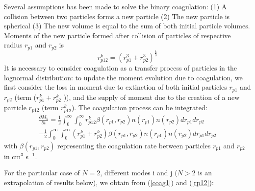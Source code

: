 Several assumptions has been made to solve the binary coagulation:
(1) A collision between two particles forms a new particle
(2) The new particle is spherical
(3) The new volume is equal to the sum of both initial particle volumes.
Moments of the new particle formed after collision of particles of respective radius 
$r_{p1}$ and $r_{p2}$ is 
\begin{equation}
r_{p12}^k = (r_{p1}^3 + r_{p2}^3)^{\frac{k}{3}}
\label{rp12}
\end{equation}
It is necessary to consider coagulation as a transfer process  of particles in 
the lognormal distribution: to update the moment evolution due to coagulation, 
 we first consider the loss in moment due to extinction of 
both initial particles 
 $r_{p1}$ and $r_{p2}$ (term ($r_{p1}^k + r_{p2}^k$ )), and the supply of moment 
due to the
 creation of a new particle  $r_{p12}$ (term  $r_{p12}^k$). 
 The coagulation process can be integrated:
 \begin{eqnarray}
\frac{\partial M_k}{\partial t} = \frac{1}{2} \int_{0}^{\infty} 
\int_{0}^{\infty} r_{p12}^k
\beta(r_{p1},r_{p2}) n(r_{p1}) n(r_{p2}) dr_{p1} dr_{p2} \nonumber \\
- \frac{1}{2} \int_{0}^{\infty} \int_{0}^{\infty} (r_{p1}^k + r_{p2}^k)
\beta(r_{p1},r_{p2}) n(r_{p1}) n(r_{p2})  dr_{p1} dr_{p2}
\label{coag1}
\end{eqnarray}
with $\beta(r_{p1},r_{p2})$ representing the coagulation rate between particles 
$r_{p1}$ and 
$ r_{p2}$ in cm$^3$ s$^{-1}$.

For the particular case of $N=2$, different modes i and j  ($N > 2$ is an 
extrapolation of results below),  we 
obtain from (\ref{coag1}) and (\ref{rp12}):

